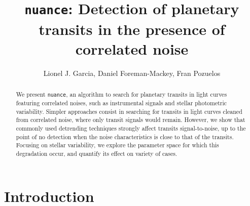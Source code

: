 \documentclass{aastex631}
\begin{document}
\title{\texttt{nuance}: Detection of planetary transits in the presence of correlated noise}

\author{Lionel J. Garcia, Daniel Foreman-Mackey, Fran Pozuelos}

\begin{abstract}
    We present \texttt{nuance}, an algorithm to search for planetary transits in light curves featuring correlated noises, such as instrumental signals and stellar photometric variability. Simpler approaches consist in searching for transits in light curves cleaned from correlated noise, where only transit signals would remain. However, we show that commonly used detrending techniques strongly affect transits signal-to-noise, up to the point of no detection when the noise characteristics is close to that of the transits. Focusing on stellar variability, we explore the parameter space for which this degradation occur, and quantify its effect on variety of cases.
\end{abstract}

\section*{Introduction}
\label{sec:intro}
\end{document}

